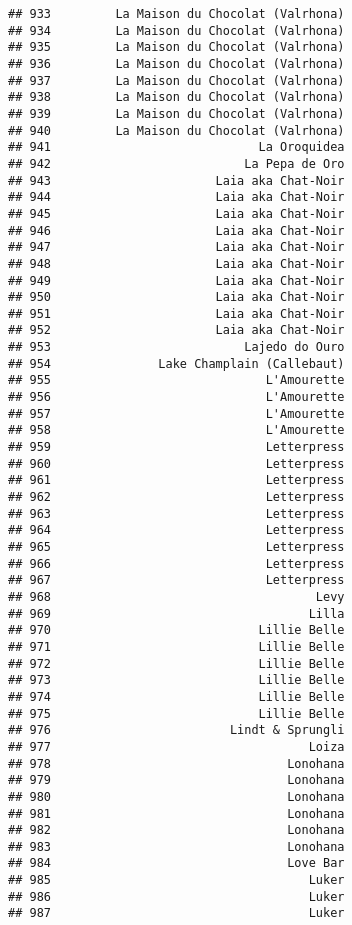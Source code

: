 \documentclass[
]{article}
\begin{document}
\begin{verbatim}
## 933         La Maison du Chocolat (Valrhona)
## 934         La Maison du Chocolat (Valrhona)
## 935         La Maison du Chocolat (Valrhona)
## 936         La Maison du Chocolat (Valrhona)
## 937         La Maison du Chocolat (Valrhona)
## 938         La Maison du Chocolat (Valrhona)
## 939         La Maison du Chocolat (Valrhona)
## 940         La Maison du Chocolat (Valrhona)
## 941                             La Oroquidea
## 942                           La Pepa de Oro
## 943                       Laia aka Chat-Noir
## 944                       Laia aka Chat-Noir
## 945                       Laia aka Chat-Noir
## 946                       Laia aka Chat-Noir
## 947                       Laia aka Chat-Noir
## 948                       Laia aka Chat-Noir
## 949                       Laia aka Chat-Noir
## 950                       Laia aka Chat-Noir
## 951                       Laia aka Chat-Noir
## 952                       Laia aka Chat-Noir
## 953                           Lajedo do Ouro
## 954               Lake Champlain (Callebaut)
## 955                              L'Amourette
## 956                              L'Amourette
## 957                              L'Amourette
## 958                              L'Amourette
## 959                              Letterpress
## 960                              Letterpress
## 961                              Letterpress
## 962                              Letterpress
## 963                              Letterpress
## 964                              Letterpress
## 965                              Letterpress
## 966                              Letterpress
## 967                              Letterpress
## 968                                     Levy
## 969                                    Lilla
## 970                             Lillie Belle
## 971                             Lillie Belle
## 972                             Lillie Belle
## 973                             Lillie Belle
## 974                             Lillie Belle
## 975                             Lillie Belle
## 976                         Lindt & Sprungli
## 977                                    Loiza
## 978                                 Lonohana
## 979                                 Lonohana
## 980                                 Lonohana
## 981                                 Lonohana
## 982                                 Lonohana
## 983                                 Lonohana
## 984                                 Love Bar
## 985                                    Luker
## 986                                    Luker
## 987                                    Luker

\end{verbatim}
\end{document}
